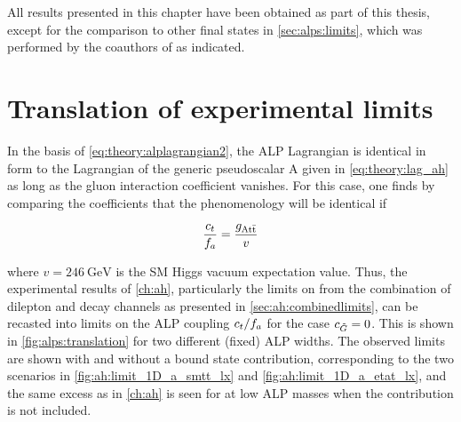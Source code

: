 All results presented in this chapter have been obtained as part of this thesis, except for the comparison to other final states in \cref{sec:alps:limits}, which was performed by the coauthors of  as indicated.


\section{Translation of experimental limits}
\label{sec:alps:translation}

In the basis of \cref{eq:theory:alplagrangian2}, the ALP Lagrangian is identical in form to the Lagrangian of the generic pseudoscalar A given in \cref{eq:theory:lag_ah} as long as the gluon interaction coefficient \cG vanishes. For this case, one finds by comparing the coefficients that the phenomenology will be identical if

\begin{equation}
    \frac{c_t}{f_a} = \frac{g_{\mathrm{A t \bar{t}}}}{v}
\end{equation}

\noindent where $v=\SI{246}{\GeV}$ is the SM Higgs vacuum expectation value. Thus, the experimental results of \cref{ch:ah}, particularly the limits on \gAtt from the combination of dilepton and \ljets decay channels as presented in \cref{sec:ah:combinedlimits}, can be recasted into limits on the ALP coupling $c_t/f_a$ for the case $c_{\tilde{G}} = 0$. This is shown in \cref{fig:alps:translation} for two different (fixed) ALP widths.
The observed limits are shown with and without a \ttbar bound state contribution, corresponding to the two scenarios in \cref{fig:ah:limit_1D_a_smtt_lx} and \cref{fig:ah:limit_1D_a_etat_lx}, and the same excess as in \cref{ch:ah} is seen for at low ALP masses when the \etat contribution is not included.

